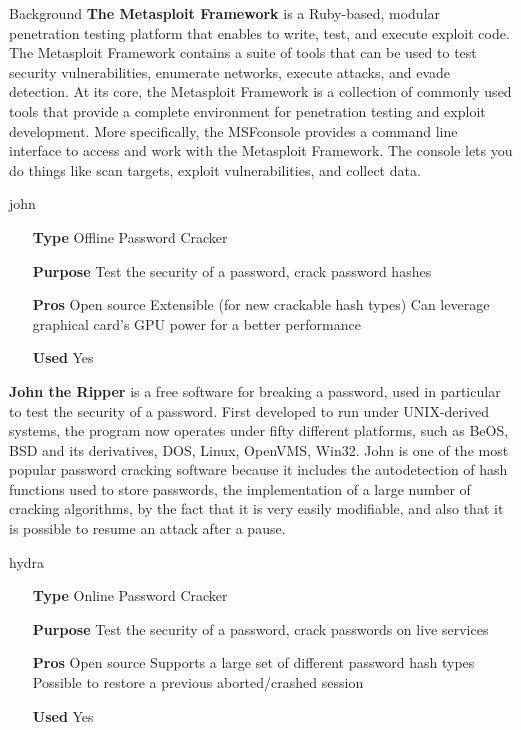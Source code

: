 \begin{chaptercover}{Background}
\textbf{The Metasploit Framework} \cite{metasploit} is a Ruby-based, modular penetration testing platform that enables to write, test, and execute exploit code. The Metasploit Framework contains a suite of tools that can be used to test security vulnerabilities, enumerate networks, execute attacks, and evade detection. At its core, the Metasploit Framework is a collection of commonly used tools that provide a complete environment for penetration testing and exploit development. More specifically, the MSFconsole provides a command line interface to access and work with the Metasploit Framework. The console lets you do things like scan targets, exploit vulnerabilities, and collect data.

\begin{solutiondata}{john}
\begin{itemize}[labelsep=1cm]
  \item [\textbf{Type}] Offline Password Cracker
  \item [\textbf{Purpose}] Test the security of a password, crack password hashes
  \item [\textbf{Pros}] Open source \newline Extensible (for new crackable hash types) \newline Can leverage graphical card's GPU power for a better performance
  \item [\textbf{Used}] Yes
\end{itemize}
\end{solutiondata}

\textbf{John the Ripper} \cite{john} is a free software for breaking a password, used in particular to test the security of a password. First developed to run under UNIX-derived systems, the program now operates under fifty different platforms, such as BeOS, BSD and its derivatives, DOS, Linux, OpenVMS, Win32. John is one of the most popular password cracking software because it includes the autodetection of hash functions used to store passwords, the implementation of a large number of cracking algorithms, by the fact that it is very easily modifiable, and also that it is possible to resume an attack after a pause.

\begin{solutiondata}{hydra}
\begin{itemize}[labelsep=1cm]
  \item [\textbf{Type}] Online Password Cracker
  \item [\textbf{Purpose}] Test the security of a password, crack passwords on live services
  \item [\textbf{Pros}] Open source \newline Supports a large set of different password hash types \newline Possible to restore a previous aborted/crashed session
  \item [\textbf{Used}] Yes
\end{itemize}
\end{solutiondata}


\end{chaptercover}
